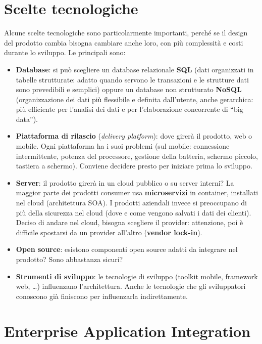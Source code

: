 \section{Scelte tecnologiche}\label{scelte-tecnologiche}

Alcune scelte tecnologiche sono particolarmente importanti, perché se il
design del prodotto cambia bisogna cambiare anche loro, con più
complessità e costi durante lo sviluppo. Le principali sono:

\begin{itemize}
\tightlist
\item
  \textbf{Database}: si può scegliere un database relazionale
  \textbf{SQL} (dati organizzati in tabelle strutturate: adatto quando
  servono le transazioni e le strutture dati sono prevedibili e
  semplici) oppure un database non strutturato \textbf{NoSQL}
  (organizzazione dei dati più flessibile e definita dall'utente, anche
  gerarchica: più efficiente per l'analisi dei dati e per l'elaborazione
  concorrente di ``big data'').
\item
  \textbf{Piattaforma di rilascio} (\emph{delivery platform}): dove
  girerà il prodotto, web o mobile. Ogni piattaforma ha i suoi problemi
  (sul mobile: connessione intermittente, potenza del processore,
  gestione della batteria, schermo piccolo, tastiera a schermo).
  Conviene decidere presto per iniziare prima lo sviluppo.
\item
  \textbf{Server}: il prodotto girerà in un cloud pubblico o su server
  interni? La maggior parte dei prodotti consumer usa
  \textbf{microservizi} in container, installati nel cloud (architettura
  SOA). I prodotti aziendali invece si preoccupano di più della
  sicurezza nel cloud (dove e come vengono salvati i dati dei clienti).
  Deciso di andare nel cloud, bisogna scegliere il provider: attenzione,
  poi è difficile spostarsi da un provider all'altro (\textbf{vendor
  lock-in}).
\item
  \textbf{Open source}: esistono componenti open source adatti da
  integrare nel prodotto? Sono abbastanza sicuri?
\item
  \textbf{Strumenti di sviluppo}: le tecnologie di sviluppo (toolkit
  mobile, framework web, \ldots) influenzano l'architettura. Anche le
  tecnologie che gli sviluppatori conoscono già finiscono per
  influenzarla indirettamente.
\end{itemize}

\section{Enterprise Application
Integration}\label{enterprise-application-integration}

